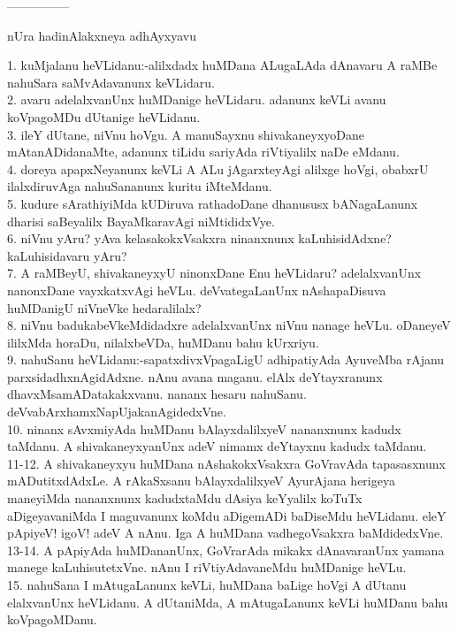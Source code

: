 \documentclass{article}
\begin{document}
\begin{center}
---------------
\end{center}

\begin{center}
nUra hadinAlakxneya adhAyxyavu
\end{center}

1. kuMjalanu heVLidanu:-alilxdadx huMDana ALugaLAda dAnavaru A raMBe nahuSara saMvAdavanunx keVLidaru.\\
2. avaru adelalxvanUnx huMDanige heVLidaru. adanunx keVLi avanu koVpagoMDu dUtanige heVLidanu.\\
3. ileY dUtane, niVnu hoVgu. A manuSayxnu shivakaneyxyoDane mAtanADidanaMte, adanunx tiLidu sariyAda riVtiyalilx naDe eMdanu.\\
4. doreya apapxNeyanunx keVLi A ALu jAgarxteyAgi alilxge hoVgi, obabxrU ilalxdiruvAga nahuSananunx kuritu iMteMdanu.\\
5. kudure sArathiyiMda kUDiruva rathadoDane dhanususx bANagaLanunx dharisi saBeyalilx BayaMkaravAgi niMtididxVye.\\
6. niVnu yAru? yAva kelasakokxVsakxra ninanxnunx kaLuhisidAdxne? kaLuhisidavaru yAru?\\
7. A raMBeyU, shivakaneyxyU ninonxDane Enu heVLidaru? adelalxvanUnx nanonxDane vayxkatxvAgi heVLu. deVvategaLanUnx nAshapaDisuva huMDanigU niVneVke hedaralilalx?\\
8. niVnu badukabeVkeMdidadxre adelalxvanUnx niVnu nanage heVLu. oDaneyeV ililxMda horaDu, nilalxbeVDa, huMDanu bahu kUrxriyu.\\
9. nahuSanu heVLidanu:-sapatxdivxVpagaLigU adhipatiyAda AyuveMba rAjanu parxsidadhxnAgidAdxne. nAnu avana maganu. elAlx deYtayxranunx dhavxMsamADatakakxvanu. nananx hesaru nahuSanu. deVvabArxhamxNapUjakanAgidedxVne.\\
10. ninanx sAvxmiyAda huMDanu bAlayxdalilxyeV nananxnunx kadudx taMdanu. A shivakaneyxyanUnx adeV nimamx deYtayxnu kadudx taMdanu.\\
11-12. A shivakaneyxyu huMDana nAshakokxVsakxra GoVravAda tapasasxnunx mADutitxdAdxLe. A rAkaSxsanu bAlayxdalilxyeV AyurAjana herigeya maneyiMda nananxnunx kadudxtaMdu dAsiya keYyalilx koTuTx aDigeyavaniMda I maguvanunx koMdu aDigemADi baDiseMdu heVLidanu. eleY pApiyeV! igoV! adeV A nAnu. Iga A huMDana vadhegoVsakxra baMdidedxVne.\\
13-14. A pApiyAda huMDananUnx, GoVrarAda mikakx dAnavaranUnx yamana manege kaLuhisutetxVne. nAnu I riVtiyAdavaneMdu huMDanige heVLu.\\
15. nahuSana I mAtugaLanunx keVLi, huMDana baLige hoVgi A dUtanu elalxvanUnx heVLidanu. A dUtaniMda, A mAtugaLanunx keVLi huMDanu bahu koVpagoMDanu.\\
\end{document}
